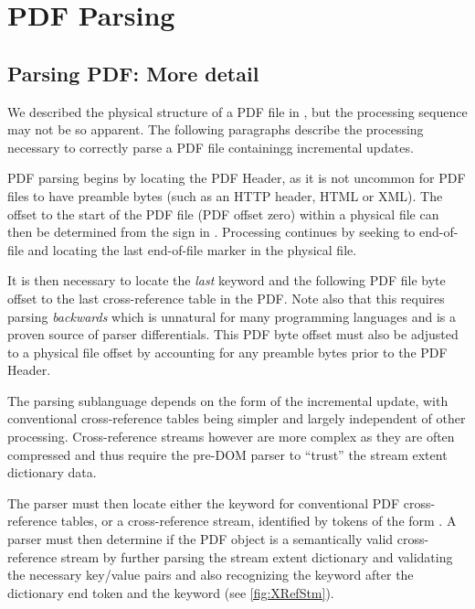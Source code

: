 \section{PDF Parsing}
\label{sec:parsing}

 

\subsection{Parsing PDF: More detail}
\label{sec:parsingfile}

We described the physical structure of a PDF file in ,
but the processing sequence may not be so apparent.
The following paragraphs describe the processing necessary to correctly parse a PDF file containingg incremental updates.

PDF parsing begins by locating the PDF Header, as it is not uncommon for PDF files to have 
preamble bytes (such as an HTTP header, HTML or XML). The offset to the start of the PDF file 
(PDF offset zero)
within a physical file can then be determined from the \lstcd{\%} sign in . 
Processing continues by seeking to end-of-file and locating the last end-of-file marker  in the physical file.

It is then necessary to locate the \emph{last}  keyword and the following PDF file byte offset 
to the last cross-reference table in the PDF. Note also that this requires parsing \emph{backwards}
which is unnatural for many programming languages and is a proven source of parser differentials. 
This PDF byte offset must also be adjusted to a physical file offset by accounting for any preamble bytes prior to the PDF Header.

The parsing sublanguage depends on the form of the incremental update, with
conventional cross-reference tables being simpler and largely independent of
other processing. Cross-reference streams however are more complex as they are
often compressed and thus require the pre-DOM parser to ``trust'' the stream
extent dictionary data.

The parser must then locate either the  keyword for
conventional PDF cross-reference tables, or a cross-reference stream, identified by tokens of the form  . 
A parser must then determine if the PDF object is a
semantically valid cross-reference stream by further parsing the stream extent dictionary and 
validating the necessary key/value pairs and also recognizing the  keyword after the dictionary end token \lstcd{>>} and the  keyword (see \cref{fig:XRefStm}). 

